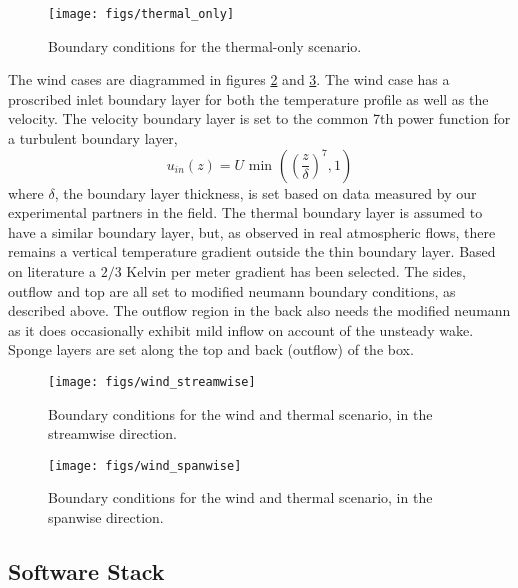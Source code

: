\begin{figure}[!htb]
  \begin{center}
    \texttt{[image: figs/thermal\_only]}
    \caption{Boundary conditions for the thermal-only scenario. }
    \label{fig:thermalbc}
  \end{center}
\end{figure}

The wind cases are diagrammed in figures \ref{fig:windstream} and
\ref{fig:windspan}. The wind case has a proscribed inlet boundary layer
for both the temperature profile as well as the velocity. The velocity
boundary layer is set to the common 7th power function for a
turbulent boundary layer,  
\begin{equation*}
  u_{in}(z) = U \text{ min }\left(\left(\frac{z}{\delta}\right)^7,1\right)
\end{equation*}
where $\delta$, the boundary layer thickness, is set based on data
measured by our experimental partners in the field. 
The thermal boundary layer is assumed to have a similar boundary layer,
but, as observed in real atmospheric flows, there remains a vertical
temperature gradient outside the thin boundary layer. Based on
literature a $2/3$ Kelvin per meter gradient has been
selected\cite{Blocken2007238}. The sides, outflow and top are all set to
modified neumann boundary conditions, as described above. The outflow
region in the back also needs the modified neumann as it does
occasionally exhibit mild inflow on account of the unsteady wake. Sponge
layers are set along the top and back (outflow) of the box. 

%
%
\begin{figure}[!htb]
  \begin{center}
    \texttt{[image: figs/wind\_streamwise]}
    \caption{Boundary conditions for the wind and thermal scenario, in
   the streamwise direction.} 
    \label{fig:windstream}
  \end{center}
\end{figure}

\begin{figure}[!htb]
  \begin{center}
    \texttt{[image: figs/wind\_spanwise]}
    \caption{Boundary conditions for the wind and thermal scenario, in
   the spanwise direction. } 
    \label{fig:windspan}
  \end{center}
\end{figure}


\subsection{Software Stack}

